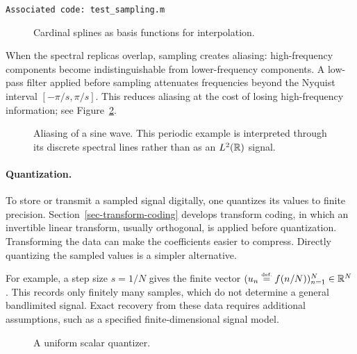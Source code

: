 \texttt{Associated code: test\_sampling.m}

\begin{figure}[tbp]
\centering
{}
\caption{Cardinal splines as basis functions for interpolation.}
\label{fig-sampling-splines}
\end{figure}



When the spectral replicas overlap, sampling creates aliasing: high-frequency components become indistinguishable from lower-frequency components. A low-pass filter applied before sampling attenuates frequencies beyond the Nyquist interval $[-\pi/s,\pi/s]$. This reduces aliasing at the cost of losing high-frequency information; see Figure~\ref{fig-aliasing}.

\begin{figure}[tbp]
\centering
{}
\caption{Aliasing of a sine wave. This periodic example is interpreted through its discrete spectral lines rather than as an $L^2(\mathbb{R})$ signal.}
\label{fig-aliasing}
\end{figure}

\paragraph{Quantization.}

To store or transmit a sampled signal digitally, one quantizes its values to finite precision.
% 
Section~\ref{sec-transform-coding} develops transform coding, in which an invertible linear transform, usually orthogonal, is applied before quantization. Transforming the data can make the coefficients easier to compress. Directly quantizing the sampled values is a simpler alternative.

For example, a step size $s=1/N$ gives the finite vector $(u_n \stackrel{\mbox{\upshape\tiny def.}}{=} f(n/N))_{n=1}^{N} \in \mathbb{R}^N$. This records only finitely many samples, which do not determine a general bandlimited signal. Exact recovery from these data requires additional assumptions, such as a specified finite-dimensional signal model.

\begin{figure}[tbp]
\centering
{}
\caption{A uniform scalar quantizer.}
\label{fig-review-shannon-quantizer}
\end{figure}

